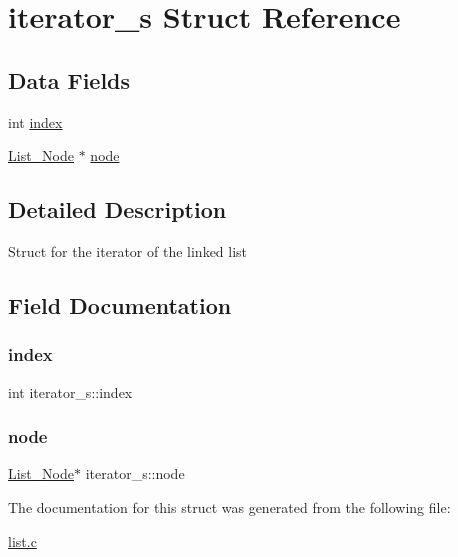 \hypertarget{structiterator__s}{}\section{iterator\+\_\+s Struct Reference}
\label{structiterator__s}
\subsection*{Data Fields}
\begin{DoxyCompactItemize}
\item 
int \mbox{\hyperlink{structiterator__s_a6191162fc508b597850d032b71fb0363}{index}}
\item 
\mbox{\hyperlink{list_8h_a541ea301c0b5aedcd24808db52ba1036}{List\+\_\+\+Node}} $\ast$ \mbox{\hyperlink{structiterator__s_a572e9a1c4acf04f84473802c51205c04}{node}}
\end{DoxyCompactItemize}


\subsection{Detailed Description}
Struct for the iterator of the linked list 

\subsection{Field Documentation}
\mbox{\label{structiterator__s_a6191162fc508b597850d032b71fb0363}} 
\subsubsection{\texorpdfstring{index}{index}}
{\footnotesize\ttfamily int iterator\+\_\+s\+::index}

\mbox{\label{structiterator__s_a572e9a1c4acf04f84473802c51205c04}} 
\subsubsection{\texorpdfstring{node}{node}}
{\footnotesize\ttfamily \mbox{\hyperlink{list_8h_a541ea301c0b5aedcd24808db52ba1036}{List\+\_\+\+Node}}$\ast$ iterator\+\_\+s\+::node}



The documentation for this struct was generated from the following file\+:\begin{DoxyCompactItemize}
\item 
\mbox{\hyperlink{list_8c}{list.\+c}}\end{DoxyCompactItemize}

